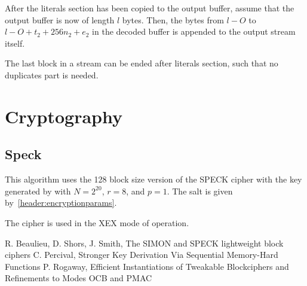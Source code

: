 \documentclass[11pt,a4paper]{report}
\begin{document}
        After the literals section has been copied to the output buffer, assume
        that the output buffer is now of length $l$ bytes. Then, the bytes from
        $l - O$ to $l - O + t_2 + 256n_2 + e_2$ in the decoded buffer is
        appended to the output stream itself.

        The last block in a stream can be ended after literals section, such
        that no duplicates part is needed.

    \section{Cryptography}
        \subsection{Speck}
        \label{crypto:speck}
        This algorithm uses the 128 block size version of the SPECK
        cipher\cite{speck} with the key generated by \cite{scrypt} with $N =
        2^{20}$, $r = 8$, and $p = 1$. The salt is given
        by~\ref{header:encryptionparams}.

        The cipher is used in the XEX mode of operation\cite{xex}.

    \begin{thebibliography}{9}
        R. Beaulieu, D. Shors, J. Smith, The SIMON and SPECK lightweight block ciphers
        C. Percival, Stronger Key Derivation Via Sequential Memory-Hard Functions
        P. Rogaway, Efficient Instantiations of Tweakable Blockciphers and Refinements to Modes OCB and PMAC
    \end{thebibliography}
\end{document}
